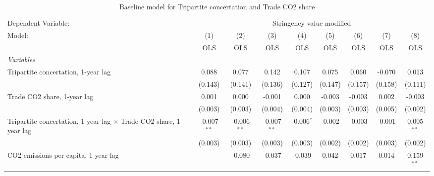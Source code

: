
\begin{table}[htbp]
   \caption{Baseline model for Tripartite concertation and Trade CO2 share}
   \centering
   \begin{tabular}{lcccccccc}
      \toprule
      Dependent Variable: & \multicolumn{8}{c}{Stringency value modified}\\
      Model:                                                                    & (1)           & (2)           & (3)           & (4)          & (5)         & (6)          & (7)          & (8)\\  
                                                                                &  OLS          & OLS           & OLS           & OLS          & OLS         & OLS          & OLS          & OLS\\  
      \midrule
      \emph{Variables}\\
      Tripartite concertation, 1-year lag                                       & 0.088         & 0.077         & 0.142         & 0.107        & 0.075       & 0.060        & -0.070       & 0.013\\   
                                                                                & (0.143)       & (0.141)       & (0.136)       & (0.127)      & (0.147)     & (0.157)      & (0.158)      & (0.111)\\   
      Trade CO2 share, 1-year lag                                               & 0.001         & 0.000         & -0.001        & 0.000        & -0.003      & -0.003       & 0.002        & -0.003\\   
                                                                                & (0.003)       & (0.003)       & (0.004)       & (0.004)      & (0.003)     & (0.003)      & (0.005)      & (0.002)\\   
      Tripartite concertation, 1-year lag $\times$ Trade CO2 share, 1-year lag  & -0.007$^{**}$ & -0.006$^{**}$ & -0.007$^{**}$ & -0.006$^{*}$ & -0.002      & -0.003       & -0.001       & 0.005$^{**}$\\   
                                                                                & (0.003)       & (0.003)       & (0.003)       & (0.003)      & (0.002)     & (0.002)      & (0.003)      & (0.002)\\   
      CO2 emissions per capita, 1-year lag                                      &               & -0.080        & -0.037        & -0.039       & 0.042       & 0.017        & 0.014        & 0.159$^{**}$\\   

\end{tabular}
\end{table}
